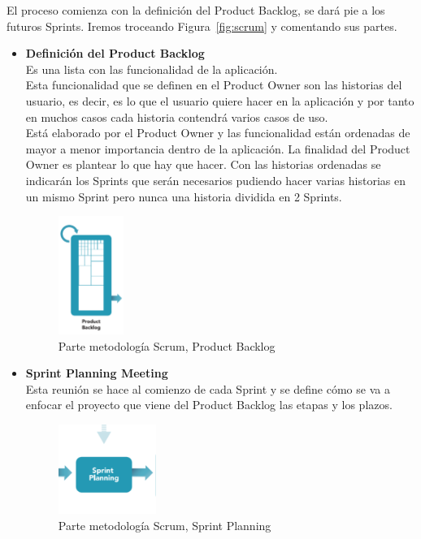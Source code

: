El proceso comienza con la definición del Product Backlog, se dará pie a los futuros Sprints.
Iremos troceando Figura~\ref{fig:scrum} y comentando sus partes.
\begin{itemize}
\item \textbf{Definición del Product Backlog}\\
Es una lista con las funcionalidad de la aplicación.\\
Esta funcionalidad que se definen en el Product Owner son las historias del usuario, es decir, es lo que el usuario quiere hacer en la aplicación y por tanto en muchos casos cada historia contendrá varios casos de uso. \\
Está elaborado por el Product Owner y las funcionalidad están ordenadas de mayor a menor importancia dentro de la aplicación. La finalidad del Product Owner es plantear lo que hay que hacer.
Con las historias ordenadas se indicarán los Sprints que serán necesarios pudiendo hacer  varias historias en un mismo Sprint pero nunca una historia dividida en 2 Sprints. 

 
 \begin{figure}[H]
		\centering
		\includegraphics[width=0.2\textwidth] {product.png}
		\caption{Parte metodología Scrum, Product Backlog }\label{fig:product}
	\end{figure} 


\item \textbf{Sprint Planning Meeting}\\
 Esta reunión se hace al comienzo de cada Sprint y se define cómo se va a enfocar el proyecto que viene del Product Backlog las etapas y los plazos.
\begin{figure}[H]
		\centering
		\includegraphics[width=0.3\textwidth] {planing.png}
		\caption{Parte metodología Scrum, Sprint Planning }\label{fig:planing}
	\end{figure} 


\end{itemize}
